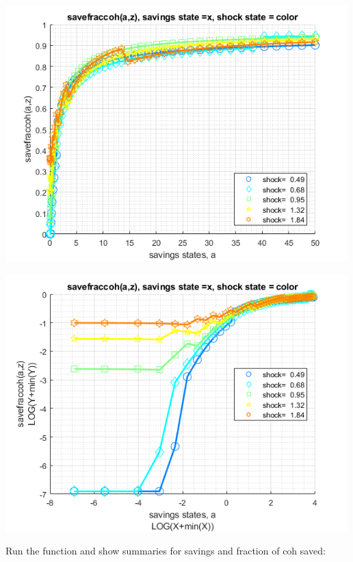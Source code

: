 \documentclass[
]{book}
\begin{document}
\includegraphics[width=5.20833in,height=\textheight]{img/fx_vfi_az_loop_images/figure_0.png}

\includegraphics[width=5.20833in,height=\textheight]{img/fx_vfi_az_loop_images/figure_1.png}

Run the function and show summaries for savings and fraction of coh
saved:
\end{document}
